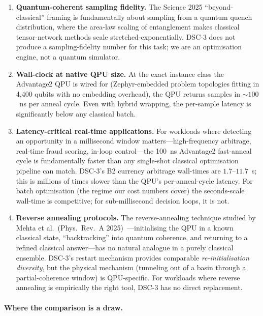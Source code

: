 \documentclass[11pt,a4paper]{article}
\begin{document}
\begin{enumerate}\itemsep0.2em
\item[\textbf{W1.}] \textbf{Quantum-coherent sampling fidelity.}
  The Science 2025 ``beyond-classical'' framing is fundamentally about
  sampling from a quantum quench distribution, where the area-law
  scaling of entanglement makes classical tensor-network methods
  scale stretched-exponentially. DSC-3 does not produce a
  sampling-fidelity number for this task; we are an optimisation
  engine, not a quantum simulator.
\item[\textbf{W2.}] \textbf{Wall-clock at native QPU size.} At the
  exact instance class the Advantage2 QPU is wired for (Zephyr-embedded
  problem topologies fitting in 4{,}400 qubits with no embedding
  overhead), the QPU returns samples in $\sim\!100$~ns per anneal
  cycle. Even with hybrid wrapping, the per-sample latency is
  significantly below any classical batch.
\item[\textbf{W3.}] \textbf{Latency-critical real-time applications.}
  For workloads where detecting an opportunity in a
  millisecond window matters---high-frequency arbitrage,
  real-time fraud scoring, in-loop control---the 100~ns Advantage2
  fast-anneal cycle is fundamentally faster than any single-shot
  classical optimisation pipeline can match. DSC-3's B2 currency
  arbitrage wall-times are $1.7$--$11.7$~s; this is millions of times
  slower than the QPU's per-anneal-cycle latency. For batch
  optimisation (the regime our cost numbers cover) the seconds-scale
  wall-time is competitive; for sub-millisecond decision loops, it is
  not.
\item[\textbf{W4.}] \textbf{Reverse annealing protocols.} The
  reverse-annealing technique studied by Mehta et al.\
  (Phys.\ Rev.\ A 2025)~\cite{mehta_reverse_2025}---initialising the
  QPU in a known classical state, ``backtracking'' into quantum
  coherence, and returning to a refined classical answer---has no
  natural analogue in a purely classical ensemble. DSC-3's restart
  mechanism provides comparable \emph{re-initialisation diversity},
  but the physical mechanism (tunneling out of a basin through a
  partial-coherence window) is QPU-specific. For workloads where
  reverse annealing is empirically the right tool, DSC-3 has no
  direct replacement.
\end{enumerate}

\paragraph{Where the comparison is a draw.}
\end{document}
